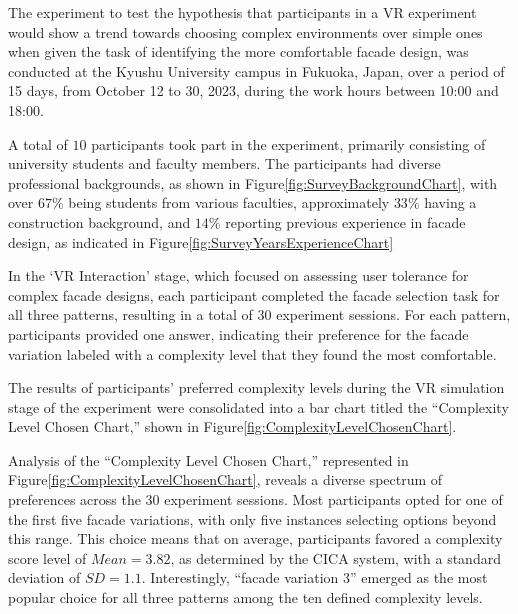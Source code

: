


The experiment to test the hypothesis that participants in a VR experiment would show a trend towards choosing complex environments over simple ones when given the task of identifying the more comfortable facade design, was conducted at the Kyushu University campus in Fukuoka, Japan, over a period of 15 days, from October 12 to 30, 2023, during the work hours between 10:00 and 18:00.

A total of \(10\) participants took part in the experiment, primarily consisting of university students and faculty members.
The participants had diverse professional backgrounds, as shown in Figure\ref{fig:SurveyBackgroundChart}, with over \(67\%\) being students from various faculties, approximately \(33\%\) having a construction background, and \(14\%\) reporting previous experience in facade design, as indicated in Figure\ref{fig:SurveyYearsExperienceChart}

In the `VR Interaction' stage, which focused on assessing user tolerance for complex facade designs, each participant completed the facade selection task for all three patterns, resulting in a total of 30 experiment sessions.
For each pattern, participants provided one answer, indicating their preference for the facade variation labeled with a complexity level that they found the most comfortable.


The results of participants' preferred complexity levels during the VR simulation stage of the experiment were consolidated into a bar chart titled the ``Complexity Level Chosen Chart,'' shown in Figure\ref{fig:ComplexityLevelChosenChart}.

Analysis of the ``Complexity Level Chosen Chart,'' represented in Figure\ref{fig:ComplexityLevelChosenChart}, reveals a diverse spectrum of preferences across the 30 experiment sessions.
Most participants opted for one of the first five facade variations, with only five instances selecting options beyond this range.
This choice means that on average, participants favored a complexity score level of \(Mean = 3.82\), as determined by the CICA system, with a standard deviation of \(SD = 1.1\).
 Interestingly, ``facade variation 3'' emerged as the most popular choice for all three patterns among the ten defined complexity levels.

